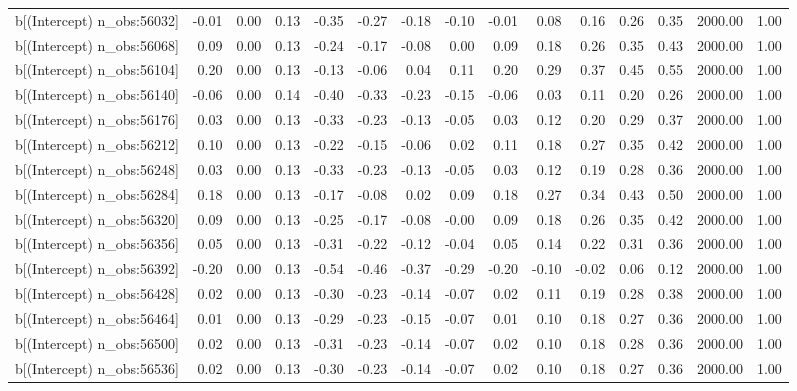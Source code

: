 \begin{table}[ht]
\begin{tabular}{rrrrrrrrrrrrrrr}
  b[(Intercept) n\_obs:56032] & -0.01 & 0.00 & 0.13 & -0.35 & -0.27 & -0.18 & -0.10 & -0.01 & 0.08 & 0.16 & 0.26 & 0.35 & 2000.00 & 1.00 \\ 
  b[(Intercept) n\_obs:56068] & 0.09 & 0.00 & 0.13 & -0.24 & -0.17 & -0.08 & 0.00 & 0.09 & 0.18 & 0.26 & 0.35 & 0.43 & 2000.00 & 1.00 \\ 
  b[(Intercept) n\_obs:56104] & 0.20 & 0.00 & 0.13 & -0.13 & -0.06 & 0.04 & 0.11 & 0.20 & 0.29 & 0.37 & 0.45 & 0.55 & 2000.00 & 1.00 \\ 
  b[(Intercept) n\_obs:56140] & -0.06 & 0.00 & 0.14 & -0.40 & -0.33 & -0.23 & -0.15 & -0.06 & 0.03 & 0.11 & 0.20 & 0.26 & 2000.00 & 1.00 \\ 
  b[(Intercept) n\_obs:56176] & 0.03 & 0.00 & 0.13 & -0.33 & -0.23 & -0.13 & -0.05 & 0.03 & 0.12 & 0.20 & 0.29 & 0.37 & 2000.00 & 1.00 \\ 
  b[(Intercept) n\_obs:56212] & 0.10 & 0.00 & 0.13 & -0.22 & -0.15 & -0.06 & 0.02 & 0.11 & 0.18 & 0.27 & 0.35 & 0.42 & 2000.00 & 1.00 \\ 
  b[(Intercept) n\_obs:56248] & 0.03 & 0.00 & 0.13 & -0.33 & -0.23 & -0.13 & -0.05 & 0.03 & 0.12 & 0.19 & 0.28 & 0.36 & 2000.00 & 1.00 \\ 
  b[(Intercept) n\_obs:56284] & 0.18 & 0.00 & 0.13 & -0.17 & -0.08 & 0.02 & 0.09 & 0.18 & 0.27 & 0.34 & 0.43 & 0.50 & 2000.00 & 1.00 \\ 
  b[(Intercept) n\_obs:56320] & 0.09 & 0.00 & 0.13 & -0.25 & -0.17 & -0.08 & -0.00 & 0.09 & 0.18 & 0.26 & 0.35 & 0.42 & 2000.00 & 1.00 \\ 
  b[(Intercept) n\_obs:56356] & 0.05 & 0.00 & 0.13 & -0.31 & -0.22 & -0.12 & -0.04 & 0.05 & 0.14 & 0.22 & 0.31 & 0.36 & 2000.00 & 1.00 \\ 
  b[(Intercept) n\_obs:56392] & -0.20 & 0.00 & 0.13 & -0.54 & -0.46 & -0.37 & -0.29 & -0.20 & -0.10 & -0.02 & 0.06 & 0.12 & 2000.00 & 1.00 \\ 
  b[(Intercept) n\_obs:56428] & 0.02 & 0.00 & 0.13 & -0.30 & -0.23 & -0.14 & -0.07 & 0.02 & 0.11 & 0.19 & 0.28 & 0.38 & 2000.00 & 1.00 \\ 
  b[(Intercept) n\_obs:56464] & 0.01 & 0.00 & 0.13 & -0.29 & -0.23 & -0.15 & -0.07 & 0.01 & 0.10 & 0.18 & 0.27 & 0.36 & 2000.00 & 1.00 \\ 
  b[(Intercept) n\_obs:56500] & 0.02 & 0.00 & 0.13 & -0.31 & -0.23 & -0.14 & -0.07 & 0.02 & 0.10 & 0.18 & 0.28 & 0.36 & 2000.00 & 1.00 \\ 
  b[(Intercept) n\_obs:56536] & 0.02 & 0.00 & 0.13 & -0.30 & -0.23 & -0.14 & -0.07 & 0.02 & 0.10 & 0.18 & 0.27 & 0.36 & 2000.00 & 1.00 \\ 

\end{tabular}
\end{table}
